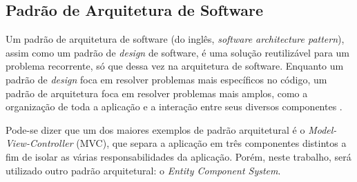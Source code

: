 \subsection{Padrão de Arquitetura de Software}

Um padrão de arquitetura de software (do inglês, \textit{software architecture pattern}), assim como um padrão de \textit{design} de software, é uma solução reutilizável para um problema recorrente, só que dessa vez na arquitetura de software. Enquanto um padrão de \textit{design} foca em resolver problemas mais específicos no código, um padrão de arquitetura foca em resolver problemas mais amplos, como a organização de toda a aplicação e a interação entre seus diversos componentes \cite{fundsoftwarearchitecture}.

Pode-se dizer que um dos maiores exemplos de padrão arquitetural é o \textit{Model-View-Controller} (MVC), que separa a aplicação em três componentes distintos a fim de isolar as várias responsabilidades da aplicação. Porém, neste trabalho, será utilizado outro padrão arquitetural: o \textit{Entity Component System}.

